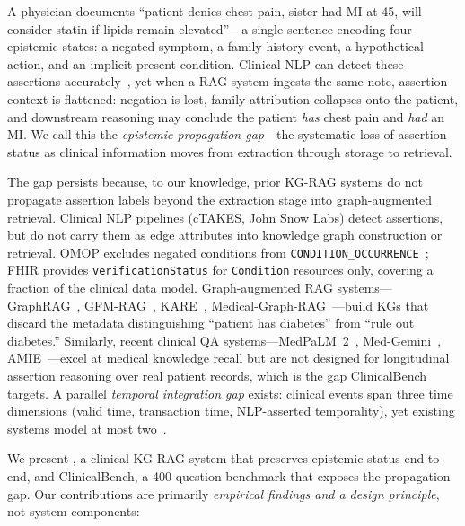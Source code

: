 
A physician documents ``patient denies chest pain, sister had MI at 45, will consider statin if lipids remain elevated''---a single sentence encoding four epistemic states: a negated symptom, a family-history event, a hypothetical action, and an implicit present condition.
Clinical NLP can detect these assertions accurately~\cite{uzuner2011i2b2assertion, gul2025beyondnegation}, yet when a RAG system ingests the same note, assertion context is flattened: negation is lost, family attribution collapses onto the patient, and downstream reasoning may conclude the patient \emph{has} chest pain and \emph{had} an MI.
We call this the \emph{epistemic propagation gap}---the systematic loss of assertion status as clinical information moves from extraction through storage to retrieval.

The gap persists because, to our knowledge, prior KG-RAG systems do not propagate assertion labels beyond the extraction stage into graph-augmented retrieval.
Clinical NLP pipelines (cTAKES, John Snow Labs) detect assertions, but do not carry them as edge attributes into knowledge graph construction or retrieval.
OMOP excludes negated conditions from \texttt{CONDITION\_OCCURRENCE}~\cite{omop2024}; FHIR provides \texttt{verificationStatus} for \texttt{Condition} resources only, covering a fraction of the clinical data model.
Graph-augmented RAG systems---GraphRAG~\cite{edge2024graphrag}, GFM-RAG~\cite{luo2025gfmrag}, KARE~\cite{jiang2025kare}, Medical-Graph-RAG~\cite{wu2025medicalgraphrag}---build KGs that discard the metadata distinguishing ``patient has diabetes'' from ``rule out diabetes.''
Similarly, recent clinical QA systems---MedPaLM~2~\cite{singhal2023medpalm2}, Med-Gemini~\cite{saab2024medgemini}, AMIE~\cite{tu2024amie}---excel at medical knowledge recall but are not designed for longitudinal assertion reasoning over real patient records, which is the gap ClinicalBench targets.
A parallel \emph{temporal integration gap} exists: clinical events span three time dimensions (valid time, transaction time, NLP-asserted temporality), yet existing systems model at most two~\cite{huang2024medtkg,ramirez2025graphiti}.

We present \epikg, a clinical KG-RAG system that preserves epistemic status end-to-end, and ClinicalBench, a 400-question benchmark that exposes the propagation gap.
Our contributions are primarily \emph{empirical findings and a design principle}, not system components:

